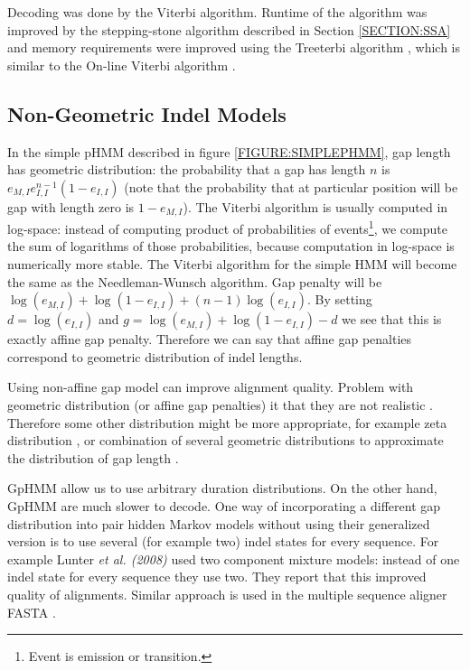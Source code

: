 Decoding was done by the Viterbi algorithm. Runtime of the algorithm was
improved by the stepping-stone algorithm described in Section \ref{SECTION:SSA}
and memory requirements were improved using the Treeterbi algorithm
\cite{Keibler2007}, which is similar to the On-line Viterbi algorithm \cite{Sramek2007}.

\subsection{Non-Geometric Indel Models}
In the simple pHMM described in figure \ref{FIGURE:SIMPLEPHMM}, gap length has
geometric distribution: the probability that a gap has length $n$ is
$e_{M,I}e_{I,I}^{n-1}(1-e_{I,I})$ (note that the probability that at particular
position will be gap with length zero is $1-e_{M,I}$). The Viterbi
algorithm is usually computed in log-space: instead of computing product of
probabilities of events\footnote{Event is emission or transition.}, we compute
the sum of logarithms of those probabilities, because computation in log-space
is numerically more stable. The Viterbi algorithm for the simple HMM
will become the same as the Needleman-Wunsch algorithm.  Gap penalty will be
$\log(e_{M,I})+\log(1-e_{I,I})+(n-1)\log(e_{I,I})$. By setting $d=\log(e_{I,I})$
and $g=\log(e_{M,I})+\log(1-e_{I,I})-d$ we see that this is exactly affine gap
penalty. Therefore we can say that affine gap penalties correspond to geometric
distribution of indel lengths.

Using non-affine gap model can improve alignment quality.  Problem with
geometric distribution (or affine gap penalties) it that they are not realistic
\cite{Cartwright2009,Lunter2008}.  Therefore some other distribution might be
more appropriate, for example zeta distribution \cite{Cartwright2009}, or
combination of several geometric distributions to approximate the distribution
of gap length \cite{Gill2004,Gill2006}.

GpHMM allow us to use arbitrary duration distributions.  On the other hand,
GpHMM are much slower to decode.  One way of incorporating a different gap
distribution into pair hidden Markov models without using their generalized
version is to use several (for example two) indel states for every sequence. For
example Lunter {\it et al. (2008)} used two component mixture models: instead of
one indel state for every sequence they use two. They report that this improved
quality of alignments. Similar approach is used in the multiple sequence aligner
FASTA \cite{Bradley2009}. \nocite{Lunter2008}

